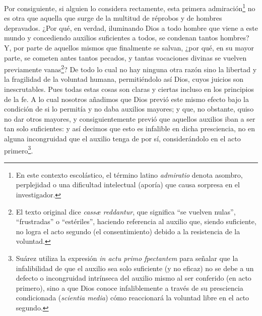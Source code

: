 \documentclass{article}
\begin{document}
Por consiguiente, si alguien lo considera rectamente, esta primera
admiración\footnote{En este contexto escolástico, el término latino \emph{admiratio}
denota asombro, perplejidad o una dificultad intelectual (aporía) que causa sorpresa en
el investigador.} no es otra que aquella que surge de la multitud de réprobos y de
hombres depravados. ¿Por qué, en verdad, iluminando Dios a todo hombre que viene a este
mundo y concediendo auxilios suficientes a todos, se condenan tantos hombres? Y, por
parte de aquellos mismos que finalmente se salvan, ¿por qué, en su mayor parte, se
cometen antes tantos pecados, y tantas vocaciones divinas se vuelven previamente
vanas\footnote{El texto original dice \emph{cassæ reddantur}, que significa \enquote{se
vuelven nulas}, \enquote{frustradas} o \enquote{estériles}, haciendo referencia al
auxilio que, siendo suficiente, no logra el acto segundo (el consentimiento) debido a la
resistencia de la voluntad.}? De todo lo cual no hay ninguna otra razón sino la libertad
y la fragilidad de la voluntad humana, permitiéndolo así Dios, cuyos juicios son
inescrutables. Pues todas estas cosas son claras y ciertas incluso en los principios de
la fe. A lo cual nosotros añadimos que Dios previó este mismo efecto bajo la condición
de si lo permitía y no daba auxilios mayores; y que, no obstante, quiso no dar otros
mayores, y consiguientemente previó que aquellos auxilios iban a ser tan solo
suficientes: y así decimos que esto es infalible en dicha presciencia, no en alguna
incongruidad que el auxilio tenga de por sí, considerándolo en el acto
primero\footnote{Suárez utiliza la expresión \emph{in actu primo fpectantem} para
señalar que la infalibilidad de que el auxilio sea solo suficiente (y no eficaz) no se
debe a un defecto o incongruidad intrínseca del auxilio mismo al ser conferido (en acto
primero), sino a que Dios conoce infaliblemente a través de su presciencia condicionada
(\emph{scientia media}) cómo reaccionará la voluntad libre en el acto segundo.}.
\end{document}
